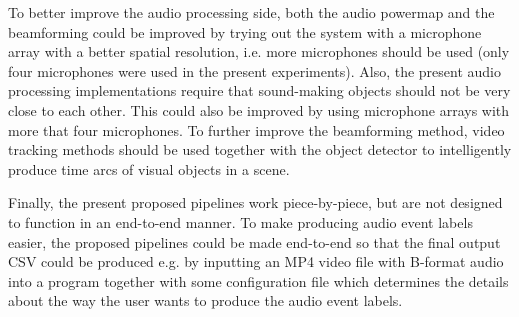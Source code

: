 To better improve the audio processing side, both the audio powermap and the beamforming could be improved by trying out the system with a microphone array with a better spatial resolution, i.e. more microphones should be used (only four microphones were used in the present experiments). Also, the present audio processing implementations require that sound-making objects should not be very close to each other. This could also be improved by using microphone arrays with more that four microphones. To further improve the beamforming method, video tracking methods should be used together with the object detector to intelligently produce time arcs of visual objects in a scene.

Finally, the present proposed pipelines work piece-by-piece, but are not designed to function in an end-to-end manner. To make producing audio event labels easier, the proposed pipelines could be made end-to-end so that the final output CSV could be produced e.g. by inputting an MP4 video file with B-format audio into a program together with some configuration file which determines the details about the way the user wants to produce the audio event labels.



